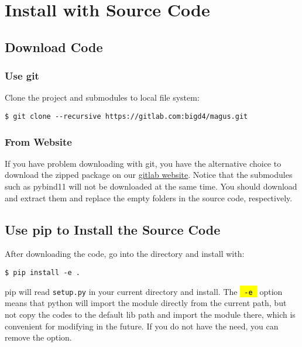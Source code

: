 \documentclass[12pt,oneside]{book}
\newcommand{\code}[1]{
  \begingroup
  \sethlcolor{Seashell}
  {\hl{\texttt{~#1~}}}
  \endgroup
}
\newcommand{\file}[1]{\texttt{#1}}
\begin{document}
\section{Install with Source Code}
\subsection{Download Code}
\subsubsection{Use git}
Clone the project and submodules to local file system:
\begin{tcolorbox}
    \begin{verbatim}
$ git clone --recursive https://gitlab.com:bigd4/magus.git
    \end{verbatim}
\end{tcolorbox}
\subsubsection{From Website}
If you have problem downloading with git, you have the alternative choice to download the zipped package on our \textcolor{blue}{\href{https://gitlab.com/bigd4/magus}{gitlab website}}. Notice that the submodules such as pybind11 will not be downloaded at the same time. You should download and extract them and replace the empty folders in the source code, respectively.

\subsection{Use pip to Install the Source Code}
After downloading the code, go into the directory and install with:
\begin{tcolorbox}
    \begin{verbatim}
$ pip install -e .
    \end{verbatim}
\end{tcolorbox}
pip will read \file{setup.py} in your current directory and install. The \code{-e} option means that python will import the module directly from the current path, but not copy the codes to the default lib path and import the module there, which is convenient for modifying in the future. If you do not have the need, you can remove the option.
\end{document}
